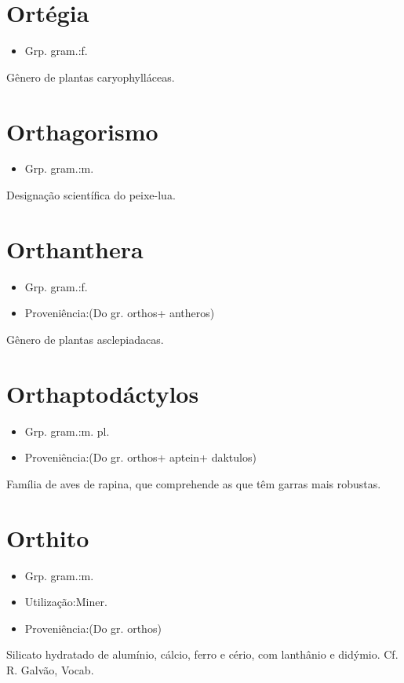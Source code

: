 \section{Ortégia}
\begin{itemize}
\item {Grp. gram.:f.}
\end{itemize}
Gênero de plantas caryophylláceas.
\section{Orthagorismo}
\begin{itemize}
\item {Grp. gram.:m.}
\end{itemize}
Designação scientífica do peixe-lua.
\section{Orthanthera}
\begin{itemize}
\item {Grp. gram.:f.}
\end{itemize}
\begin{itemize}
\item {Proveniência:(Do gr. \textunderscore orthos\textunderscore  + \textunderscore antheros\textunderscore )}
\end{itemize}
Gênero de plantas asclepiadacas.
\section{Orthaptodáctylos}
\begin{itemize}
\item {Grp. gram.:m. pl.}
\end{itemize}
\begin{itemize}
\item {Proveniência:(Do gr. \textunderscore orthos\textunderscore  + \textunderscore aptein\textunderscore  + \textunderscore daktulos\textunderscore )}
\end{itemize}
Família de aves de rapina, que comprehende as que têm garras mais robustas.
\section{Orthito}
\begin{itemize}
\item {Grp. gram.:m.}
\end{itemize}
\begin{itemize}
\item {Utilização:Miner.}
\end{itemize}
\begin{itemize}
\item {Proveniência:(Do gr. \textunderscore orthos\textunderscore )}
\end{itemize}
Silicato hydratado de alumínio, cálcio, ferro e cério, com lanthânio e didýmio. Cf. R. Galvão, \textunderscore Vocab.\textunderscore 
